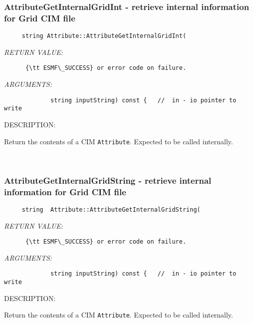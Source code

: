 \subsubsection [AttributeGetInternalGridInt] {AttributeGetInternalGridInt - retrieve internal information for Grid CIM file}


  
\begin{verbatim}     string Attribute::AttributeGetInternalGridInt(\end{verbatim}{\em RETURN VALUE:}
\begin{verbatim}      {\tt ESMF\_SUCCESS} or error code on failure.\end{verbatim}{\em ARGUMENTS:}
\begin{verbatim}             string inputString) const {   //  in - io pointer to write\end{verbatim}
{\sf DESCRIPTION:\\ }


      Return the contents of a CIM {\tt Attribute}.  Expected to be
      called internally.
   
 
\mbox{}\hrulefill\
 
\subsubsection [AttributeGetInternalGridString] {AttributeGetInternalGridString - retrieve internal information for Grid CIM file}


  
\begin{verbatim}     string  Attribute::AttributeGetInternalGridString(\end{verbatim}{\em RETURN VALUE:}
\begin{verbatim}      {\tt ESMF\_SUCCESS} or error code on failure.\end{verbatim}{\em ARGUMENTS:}
\begin{verbatim}             string inputString) const {   //  in - io pointer to write\end{verbatim}
{\sf DESCRIPTION:\\ }


      Return the contents of a CIM {\tt Attribute}.  Expected to be
      called internally.
   
 
